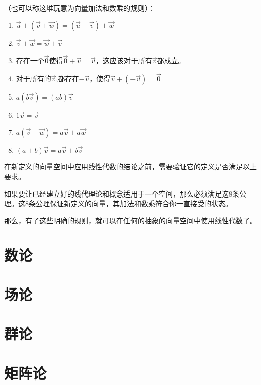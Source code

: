 \documentclass[UTF8]{ctexbook}
\begin{document}
{{{{（也可以称这堆玩意为向量加法和数乘的规则）：
\begin{enumerate}
  \item $\vec{u} + (\vec{v} + \vec{w}) = (\vec{u} + \vec{v}) + \vec{w}$
  \item $\vec{v} + \vec{w} = \vec{w} + \vec{v}$
  \item 存在一个$\vec{0}$使得$\vec{0} + \vec{v} = \vec{v}$，这应该对于所有$\vec{v}$都成立。
  \item 对于所有的$\vec{v}$,都存在$-\vec{v}$，使得$\vec{v} + (-\vec{v}) = \vec{0}$
  \item $a(b\vec{v}) = (ab)\vec{v}$
  \item $1\vec{v} = \vec{v}$
  \item $a(\vec{v} + \vec{w}) = a\vec{v} + a\vec{w}$
  \item $(a + b)\vec{v} = a\vec{v} + b\vec{v}$
\end{enumerate}

在新定义的向量空间中应用线性代数的结论之前，需要验证它的定义是否满足以上要求。

如果要让已经建立好的线代理论和概念适用于一个空间，那么必须满足这8条公理。这8条公理保证新定义的向量，其加法和数乘符合你一直接受的状态。

那么，有了这些明确的规则，就可以在任何{}的抽象的向量空间中使用线性代数了。
}%

}%

}%

\section{数论}{

 }%

\section{场论}{

 }%

\section{群论}{

 }%

\section{矩阵论}{

 }%

}%
\end{document}
